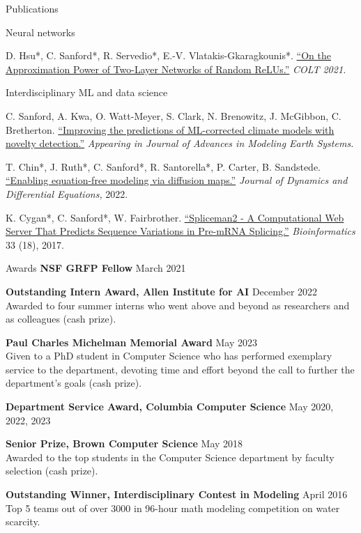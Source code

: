\documentclass{resume} %
\begin{document}
\begin{rSection}{Publications}
\begin{rSubsection}{Neural networks}{}{}{}{}
\item D. Hsu*, C. Sanford*, R. Servedio*, E.-V. Vlatakis-Gkaragkounis*. \href{https://proceedings.mlr.press/v134/hsu21a.html}{``On the Approximation Power of Two-Layer Networks of Random ReLUs.''} \textit{COLT 2021.}
\end{rSubsection}

\begin{rSubsection}{Interdisciplinary ML and data science}{}{}{}{}
\item C. Sanford, A. Kwa, O. Watt-Meyer, S. Clark, N. Brenowitz, J. McGibbon, C. Bretherton. \href{https://essopenarchive.org/doi/full/10.22541/essoar.168500343.32924398}{``Improving the predictions of ML-corrected climate models with novelty detection.''} \textit{Appearing in Journal of Advances in Modeling Earth Systems.}

\item T. Chin*, J. Ruth*, C. Sanford*, R. Santorella*, P. Carter, B. Sandstede. \href{https://link.springer.com/article/10.1007/s10884-021-10127-w}{``Enabling equation-free modeling via diffusion maps.''} \textit{Journal of Dynamics and Differential Equations,} 2022.

\item K. Cygan*, C. Sanford*, W. Fairbrother. \href{https://academic.oup.com/bioinformatics/article/33/18/2943/3887237?login=true}{``Spliceman2 - A Computational Web Server That Predicts Sequence Variations in Pre-mRNA Splicing.''}
\textit{Bioinformatics} 33 (18), 2017.
\end{rSubsection}


\end{rSection}



\begin{rSection}{Awards} \itemsep -2pt
\textbf{NSF GRFP Fellow} \hfill March 2021

\textbf{Outstanding Intern Award, Allen Institute for AI} \hfill December 2022\\
Awarded to four summer interns who went above and beyond as researchers and as colleagues (cash prize).

\textbf{Paul Charles Michelman Memorial Award} \hfill May 2023 \\
Given to a PhD student in Computer Science who has performed exemplary service to the department, devoting time and effort beyond the call to further the department’s goals (cash prize).

\textbf{Department Service Award, Columbia Computer Science} \hfill May 2020, 2022, 2023

\textbf{Senior Prize, Brown Computer Science} \hfill May 2018 \\
Awarded to the top students in the Computer Science department by faculty selection (cash prize).

\textbf{Outstanding Winner, Interdisciplinary Contest in Modeling} \hfill April 2016 \\
Top 5 teams out of over 3000 in 96-hour math modeling competition on water scarcity.
\end{rSection}
\end{document}
